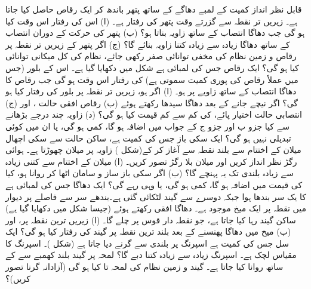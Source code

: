 قابل نظر انداز کمیت کے  لمبے دھاگے  کے ساتھ     پتھر باندھ  کر ایک رقاص حاصل کیا جاتا ہے۔ زیریں تر نقطہ سے گزرتے وقت پتھر کی رفتار  ہے۔ (ا)  اس کی رفتار اس وقت کیا ہو گی جب دھاگا انتصاب کے ساتھ  زاویہ بناتا ہو؟  (ب)   پتھر کی حرکت کے دوران  انتصاب کے ساتھ دھاگا زیادہ سے زیادہ کتنا زاویہ بنائے گا؟ (ج)  اگر  پتھر کے  زیریں تر نقطہ  پر رقاص و زمین نظام کی مخفی توانائی صفر  رکھی جائے، نظام کی کل میکانی توانائی کیا ہو گی؟
ایک رقاص جس کی لمبائی  ہے شکل  میں دکھایا گیا ہے۔  اس کے بلور (جس میں  عملاً رقاص کی پوری کمیت   سموتی ہے) کی رفتار اس وقت  ہو گی جب  رقاص کا دھاگا انتصاب کے ساتھ  زاویے پر ہو۔ (ا) اگر  ہو، زیریں تر نقطہ پر بلور کی رفتار کیا ہو گی؟    اگر  نیچے جانے کے بعد  دھاگا  سیدھا رکھتے ہوئے   (ب) رقاص   افقی حالت  ، اور (ج) انتصابی حالت اختیار  پائے،   کی کم سے کم قیمت کیا ہو گی؟  (د)  زاویہ  چند درجے بڑھانے سے کیا جزو ب اور جزو ج کے جواب میں اضافہ ہو گا، کمی ہو گی، یا ان میں کوئی تبدیلی نہیں ہو گی؟
ایک  سکی باز  جس کی کمیت  ہے، ساکن حالت سے  سکی  اچھال میلان کے اختتام   سے  بلند نقطہ سے آغاز کر کے(شکل )  زاویہ  پر میلان چھوڑتا ہے۔ ہوائی رگڑ نظر انداز  کریں اور  میلان بلا رگڑ تصور کریں۔ (ا)  میلان کے اختتام سے کتنی زیادہ سے زیادہ  بلندی   تک  یہ پہنچے گا؟ (ب)  اگر سکی باز   ساز و   سامان  اٹھا کر روانا ہو، کیا  کی قیمت میں اضافہ ہو گا، کمی ہو گی، یا وہی رہے گی؟
ایک دھاگا جس کی لمبائی  ہے کا یک سر بندھا ہوا  جبکہ دوسرے  سے گیند لٹکائی گئی ہے۔بندھے سر  سے  فاصلے پر  دیوار میں نقطہ  پر    ایک  میخ موجود ہے۔   دھاگا افقی رکھتے ہوئے (جیسا شکل  میں دکھایا گیا ہے) ساکن گیند رہا  کیا جاتا ہے، جو نقطہ دار قوس پر چلے گا۔ (ا) زیریں ترین نقطہ پر، اور (ب) میخ میں دھاگا  پھنسنے کے بعد بلند ترین نقطہ پر گیند کی رفتار کیا ہو گی؟
ایک سل جس کی کمیت  ہے اسپرنگ پر  بلندی سے گرنے دیا جاتا ہے (شکل )۔ اسپرنگ کا مقیاس لچک  ہے۔ اسپرنگ زیادہ سے زیادہ کتنا دبے گا؟
لمحہ  پر   گیند     بلند  کھمبے   سے  کے ساتھ روانا کیا جاتا ہے۔  گیند و زمین نظام کی  لمحہ  تا   کیا ہو گی (آزادانہ گرنا تصور کریں)؟
